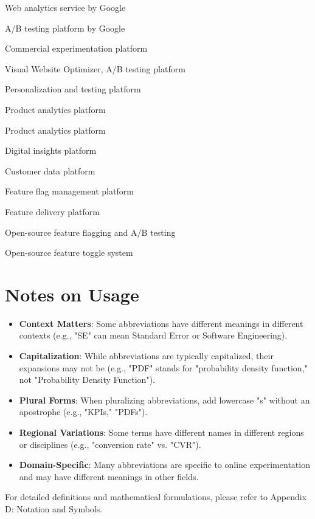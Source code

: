 \begin{description}[leftmargin=!,labelwidth=\widthof{\bfseries Google Optimize}]
\item[Google Analytics] Web analytics service by Google
\item[Google Optimize] A/B testing platform by Google
\item[Optimizely] Commercial experimentation platform
\item[VWO] Visual Website Optimizer, A/B testing platform
\item[Adobe Target] Personalization and testing platform
\item[Mixpanel] Product analytics platform
\item[Amplitude] Product analytics platform
\item[Heap] Digital insights platform
\item[Segment] Customer data platform
\item[LaunchDarkly] Feature flag management platform
\item[Split.io] Feature delivery platform
\item[GrowthBook] Open-source feature flagging and A/B testing
\item[Unleash] Open-source feature toggle system
\end{description}

\section*{Notes on Usage}

\begin{itemize}
\item \textbf{Context Matters}: Some abbreviations have different meanings in different contexts (e.g., "SE" can mean Standard Error or Software Engineering).

\item \textbf{Capitalization}: While abbreviations are typically capitalized, their expansions may not be (e.g., "PDF" stands for "probability density function," not "Probability Density Function").

\item \textbf{Plural Forms}: When pluralizing abbreviations, add lowercase "s" without an apostrophe (e.g., "KPIs," "PDFs").

\item \textbf{Regional Variations}: Some terms have different names in different regions or disciplines (e.g., "conversion rate" vs. "CVR").

\item \textbf{Domain-Specific}: Many abbreviations are specific to online experimentation and may have different meanings in other fields.
\end{itemize}

\vspace{0.5cm}

\noindent For detailed definitions and mathematical formulations, please refer to Appendix D: Notation and Symbols.
